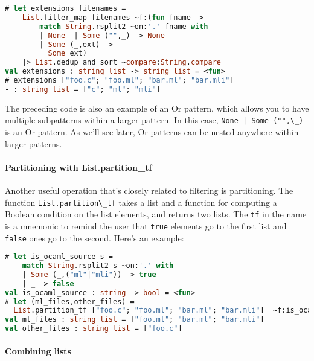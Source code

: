 \begin{lstlisting}[language=Caml]
# let extensions filenames =
    List.filter_map filenames ~f:(fun fname ->
        match String.rsplit2 ~on:'.' fname with
        | None  | Some ("",_) -> None
        | Some (_,ext) ->
          Some ext)
    |> List.dedup_and_sort ~compare:String.compare
val extensions : string list -> string list = <fun>
# extensions ["foo.c"; "foo.ml"; "bar.ml"; "bar.mli"]
- : string list = ["c"; "ml"; "mli"]
\end{lstlisting}

The preceding code is also an example of an Or pattern, which allows you
to have multiple subpatterns within a larger pattern. In this case,
\passthrough{\lstinline!None | Some ("",\_)!} is an Or pattern. As we'll
see later, Or patterns can be nested anywhere within larger patterns.

\hypertarget{partitioning-with-list.partition_tf}{%
\paragraph{Partitioning with
List.partition\_tf}\label{partitioning-with-list.partition_tf}}

Another useful operation that's closely related to filtering is
partitioning. The function \passthrough{\lstinline!List.partition\_tf!}
takes a list and a function for computing a Boolean condition on the
list elements, and returns two lists. The \passthrough{\lstinline!tf!}
in the name is a mnemonic to remind the user that
\passthrough{\lstinline!true!} elements go to the first list and
\passthrough{\lstinline!false!} ones go to the second. Here's an
example:

\begin{lstlisting}[language=Caml]
# let is_ocaml_source s =
    match String.rsplit2 s ~on:'.' with
    | Some (_,("ml"|"mli")) -> true
    | _ -> false
val is_ocaml_source : string -> bool = <fun>
# let (ml_files,other_files) =
  List.partition_tf ["foo.c"; "foo.ml"; "bar.ml"; "bar.mli"]  ~f:is_ocaml_source
val ml_files : string list = ["foo.ml"; "bar.ml"; "bar.mli"]
val other_files : string list = ["foo.c"]
\end{lstlisting}

\hypertarget{combining-lists}{%
\paragraph{Combining lists}\label{combining-lists}}


